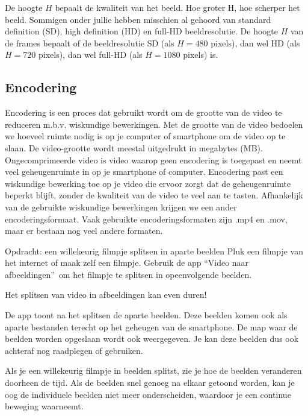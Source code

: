
De hoogte $H$ bepaalt de kwaliteit van het beeld. Hoe groter H, hoe scherper het beeld. Sommigen onder jullie hebben misschien al gehoord van standard definition (SD), high definition (HD) en full-HD beeldresolutie. 
De hoogte $H$ van de frames bepaalt of de beeldresolutie SD (als $H=480$ pixels), dan wel HD (als $H=720$ pixels), dan wel full-HD (als $H=1080$ pixels) is.

\subsection{Encodering}

Encodering is een proces dat gebruikt wordt om de grootte van de video te reduceren m.b.v. wiskundige bewerkingen. Met de grootte van de video bedoelen we hoeveel ruimte nodig is op je computer of smartphone om de video op te slaan. De video-grootte wordt meestal uitgedrukt in megabytes (MB). Ongecomprimeerde video is video waarop geen encodering is toegepast en neemt veel geheugenruimte in op je smartphone of computer. Encodering past een wiskundige bewerking toe op je video die ervoor zorgt dat de geheugenruimte beperkt blijft, zonder de kwaliteit van de video te veel aan te tasten. Afhankelijk van de gebruikte wiskundige bewerkingen krijgen we een ander encoderingsformaat. Vaak gebruikte encoderingsformaten zijn .mp4 en .mov, maar er bestaan nog veel andere formaten.


\begin{opdracht}{Opdracht: een willekeurig filmpje splitsen in aparte beelden}
Pluk een filmpje van het internet of maak zelf een filmpje. Gebruik de app \textquotedblleft Video naar afbeeldingen\textquotedblright \ om het filmpje te splitsen in opeenvolgende beelden.

\begin{opmerking}
	Het splitsen van video in afbeeldingen kan even duren!
\end{opmerking}

De app toont na het splitsen de aparte beelden. Deze beelden komen ook als aparte bestanden terecht op het geheugen van de smartphone. De map waar de beelden worden opgeslaan wordt ook weergegeven. Je kan deze beelden dus ook achteraf nog raadplegen of gebruiken.

\opdrachteindbalk

\end{opdracht}

Als je een willekeurig filmpje in beelden splitst, zie je hoe de beelden veranderen doorheen de tijd. Als de beelden snel genoeg na elkaar getoond worden, kan je oog de individuele beelden niet meer onderscheiden, waardoor je een continue beweging waarneemt.

